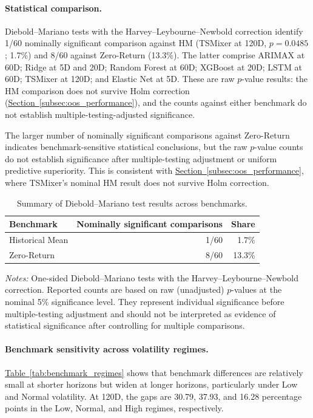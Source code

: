 \documentclass[runningheads,orivec]{llncs}
\begin{document}
\paragraph{Statistical comparison.}
Diebold--Mariano tests with the Harvey--Leybourne--Newbold correction identify 1/60 nominally significant comparison against HM (TSMixer at 120D, $p=0.0485$; 1.7\%) and 8/60 against Zero-Return (13.3\%). The latter comprise ARIMAX at 60D; Ridge at 5D and 20D; Random Forest at 60D; XGBoost at 20D; LSTM at 60D; TSMixer at 120D; and Elastic Net at 5D. These are raw $p$-value results: the HM comparison does not survive Holm correction (\hyperref[subsec:oos_performance]{Section~\ref*{subsec:oos_performance}}), and the counts against either benchmark do not establish multiple-testing-adjusted significance.

The larger number of nominally significant comparisons against Zero-Return indicates benchmark-sensitive statistical conclusions, but the raw $p$-value counts do not establish significance after multiple-testing adjustment or uniform predictive superiority. This is consistent with \hyperref[subsec:oos_performance]{Section~\ref*{subsec:oos_performance}}, where TSMixer's nominal HM result does not survive Holm correction.

\begin{table}[htbp]
\centering
\caption{Summary of Diebold--Mariano test results across benchmarks.}\label{tab:dm_benchmark_summary}
{\small
\setlength{\tabcolsep}{8pt}
\begin{tabular}{lrr}
\hline
Benchmark & Nominally significant comparisons & Share \\
\hline
Historical Mean & 1/60 & 1.7\% \\
Zero-Return     & 8/60 & 13.3\% \\
\hline
\end{tabular}}
\par\vspace{4pt}\parbox{0.8\linewidth}{\linespread{1.2}\selectfont\footnotesize\textit{Notes:} One-sided Diebold--Mariano tests with the Harvey--Leybourne--Newbold correction. Reported counts are based on raw (unadjusted) $p$-values at the nominal 5\% significance level. They represent individual significance before multiple-testing adjustment and should not be interpreted as evidence of statistical significance after controlling for multiple comparisons.\par}
\end{table}

\paragraph{Benchmark sensitivity across volatility regimes.}
\hyperref[tab:benchmark_regimes]{Table~\ref*{tab:benchmark_regimes}} shows that benchmark differences are relatively small at shorter horizons but widen at longer horizons, particularly under Low and Normal volatility. At 120D, the gaps are 30.79, 37.93, and 16.28 percentage points in the Low, Normal, and High regimes, respectively.
\end{document}
